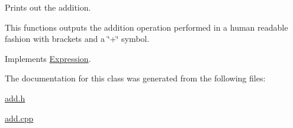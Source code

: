 Prints out the addition. 

This functions outputs the addition operation performed in a human readable fashion with brackets and a \char`\"{}+\char`\"{} symbol. 

Implements \hyperlink{class_expression_a6e05f883ebf77faf344dbaebfc82b3a0}{Expression}.



The documentation for this class was generated from the following files\+:\begin{DoxyCompactItemize}
\item 
\hyperlink{add_8h}{add.\+h}\item 
\hyperlink{add_8cpp}{add.\+cpp}\end{DoxyCompactItemize}
